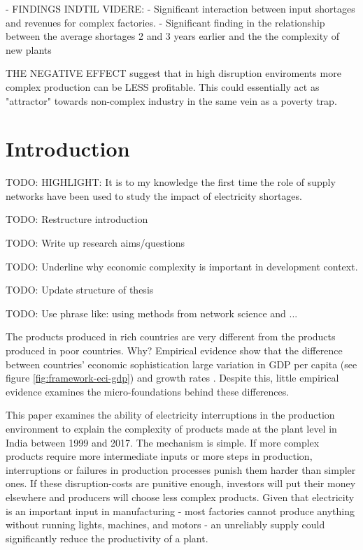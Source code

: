 \documentclass[11pt]{article}
\begin{document}
% 






 - FINDINGS INDTIL VIDERE:
 - Significant interaction between input shortages and revenues for complex factories. 
 - Significant finding in the relationship between the average shortages 2 and 3 years earlier and the the complexity of new plants 

 THE NEGATIVE EFFECT suggest that in high disruption enviroments more complex production can be LESS profitable. This could essentially act as "attractor" towards non-complex industry in the same vein as a poverty trap.


\section{Introduction}\label{sec:introduction}

TODO: HIGHLIGHT: It is to my knowledge the first time the role of supply networks have been used to study the impact of electricity shortages.

TODO: Restructure introduction

TODO: Write up research aims/questions

TODO: Underline why economic complexity is important in development context.

TODO: Update structure of thesis

TODO: Use phrase like: using methods from network science and ...

The products produced in rich countries are very different from the products produced in poor countries. Why? Empirical evidence show that the difference between countries' economic sophistication large variation in GDP per capita (see figure \ref{fig:framework-eci-gdp}) and growth rates \citep{tacchella_dynamical_2018}. Despite this, little empirical evidence examines the micro-foundations behind these differences. 

This paper examines the ability of electricity interruptions in the production environment to explain the complexity of products made at the plant level in India between 1999 and 2017. The mechanism is simple. If more complex products require more intermediate inputs or more steps in production, interruptions or failures in production processes punish them harder than simpler ones. If these disruption-costs are punitive enough, investors will put their money elsewhere and producers will choose less complex products. Given that electricity is an important input in manufacturing -  most factories cannot produce anything without running lights, machines, and motors - an unreliably supply could significantly reduce the productivity of a plant.
\end{document}

